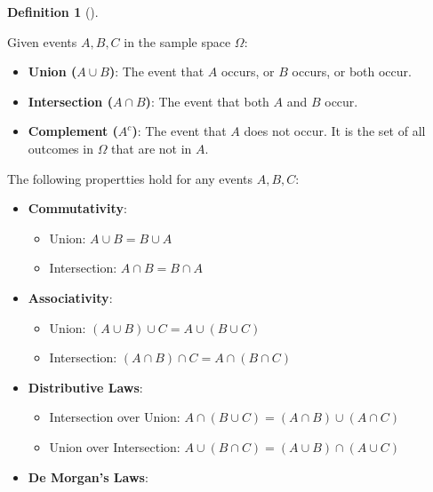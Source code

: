 \documentclass[
  letterpaper,
  DIV=11,
  numbers=noendperiod]{scrreport}
\providecommand{\tightlist}{%
  \setlength{\itemsep}{0pt}\setlength{\parskip}{0pt}}
\theoremstyle{definition}
\theoremstyle{plain}
\theoremstyle{definition}
\newtheorem{definition}{Definition}[chapter]
\theoremstyle{plain}
\theoremstyle{remark}
\begin{document}
\begin{tcolorbox}[enhanced jigsaw, breakable, opacityback=0, leftrule=.75mm, colback=white, bottomtitle=1mm, coltitle=black, toptitle=1mm, titlerule=0mm, bottomrule=.15mm, colframe=quarto-callout-note-color-frame, title={Basic Set Operations}, opacitybacktitle=0.6, colbacktitle=quarto-callout-note-color!10!white, rightrule=.15mm, arc=.35mm, toprule=.15mm, left=2mm]

\begin{definition}[]\protect\hypertarget{def-set-ops}{}\label{def-set-ops}

Given events \(A,B,C\) in the sample space \(\Omega\):

\begin{itemize}
\item
  \textbf{Union (\(A \cup B\))}: The event that \(A\) occurs, or \(B\)
  occurs, or both occur.
\item
  \textbf{Intersection (\(A \cap B\))}: The event that both \(A\) and
  \(B\) occur.
\item
  \textbf{Complement (\(A^c\))}: The event that \(A\) does not occur. It
  is the set of all outcomes in \(\Omega\) that are not in \(A\).
\end{itemize}

The following propertties hold for any events \(A, B, C\):

\begin{itemize}
\tightlist
\item
  \textbf{Commutativity}:

  \begin{itemize}
  \tightlist
  \item
    Union: \(A \cup B = B \cup A\)
  \item
    Intersection: \(A \cap B = B \cap A\)
  \end{itemize}
\item
  \textbf{Associativity}:

  \begin{itemize}
  \tightlist
  \item
    Union: \((A \cup B) \cup C = A \cup (B \cup C)\)
  \item
    Intersection: \((A \cap B) \cap C = A \cap (B \cap C)\)
  \end{itemize}
\item
  \textbf{Distributive Laws}:

  \begin{itemize}
  \tightlist
  \item
    Intersection over Union:
    \(A \cap (B \cup C) = (A \cap B) \cup (A \cap C)\)
  \item
    Union over Intersection:
    \(A \cup (B \cap C) = (A \cup B) \cap (A \cup C)\)
  \end{itemize}
\item
  \textbf{De Morgan's Laws}:


\end{itemize}
\end{definition}
\end{tcolorbox}
\end{document}
